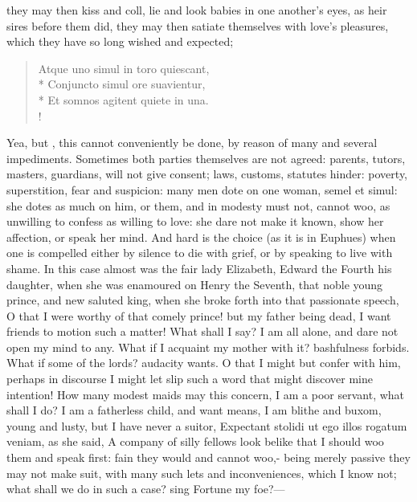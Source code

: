 they may then kiss and coll, lie and look babies in one another's eyes,
as heir sires before them did, they may then satiate themselves with
love's pleasures, which they have so long wished and expected;
%
\begin{latin}%
\begin{verse}%
Atque uno simul in toro quiescant,\\*
Conjuncto simul ore suavientur,\\*
Et somnos agitent quiete in una.\\!
\end{verse}%
\end{latin}%
%
Yea, but , this cannot conveniently be done, by
reason of many and several impediments. Sometimes both parties
themselves are not agreed: parents, tutors, masters, guardians, will
not give consent; laws, customs, statutes hinder: poverty,
superstition, fear and suspicion: many men dote on one woman, semel et
simul: she dotes as much on him, or them, and in modesty must not,
cannot woo, as unwilling to confess as willing to love: she dare not
make it known, show her affection, or speak her mind. And hard is the
choice (as it is in Euphues) when one is compelled either by silence to
die with grief, or by speaking to live with shame. In this case almost
was the fair lady Elizabeth, Edward the Fourth his daughter, when she
was enamoured on Henry the Seventh, that noble young prince, and new
saluted king, when she broke forth into that passionate speech, 
O that I were worthy of that comely prince! but my father being dead, I
want friends to motion such a matter! What shall I say? I am all alone,
and dare not open my mind to any. What if I acquaint my mother with it?
bashfulness forbids. What if some of the lords? audacity wants. O that
I might but confer with him, perhaps in discourse I might let slip such
a word that might discover mine intention! How many modest maids may
this concern, I am a poor servant, what shall I do? I am a fatherless
child, and want means, I am blithe and buxom, young and lusty, but I
have never a suitor, Expectant stolidi ut ego illos rogatum veniam, as
she said, A company of silly fellows look belike that I should
woo them and speak first: fain they would and cannot woo,- being merely passive they may not make suit, with
many such lets and inconveniences, which I know not; what shall we do
in such a case? sing Fortune my foe?---

